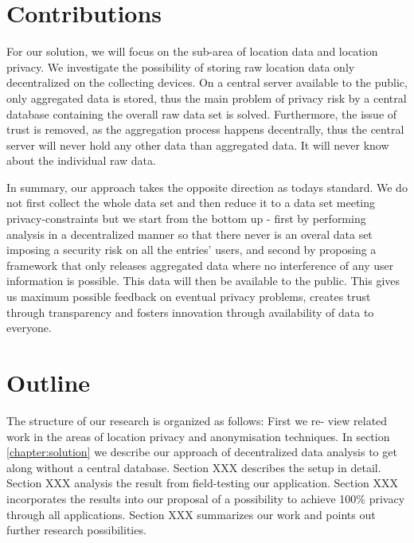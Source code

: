 \section{Contributions}
For our solution, we will focus on the sub-area of location data and location privacy.
We investigate the possibility of storing raw location data only decentralized on the collecting devices. On a central server available to the public, only aggregated data is stored, thus the main problem of privacy risk by a central database containing the overall raw data set is solved. Furthermore, the issue of trust is removed, as the aggregation process happens decentrally, thus the central server will never hold any other data than aggregated data. It will never know about the individual raw data.

In summary, our approach takes the opposite direction as todays standard. We do not first collect the whole data set and then reduce it to a data set meeting privacy-constraints but we start from the bottom up - first by performing analysis in a decentralized manner so that there never is an overal data set imposing a security risk on all the entries' users, and second by proposing a framework that only releases aggregated data where no interference of any user information is possible. This data will then be available to the public. This gives us maximum possible feedback on eventual privacy problems, creates trust through transparency and fosters innovation through availability of data to everyone.


\section{Outline}
The structure of our research is organized as follows: First we re-
view related work in the areas of location privacy and anonymisation techniques. In
section \ref{chapter:solution} we describe our approach of decentralized data analysis to get along without a central database.
Section XXX describes the setup in detail. Section XXX analysis the result from field-testing our application.
Section XXX incorporates the results into our proposal of a possibility to achieve 100\% privacy through all applications.
Section XXX summarizes our work and points out further research possibilities.

